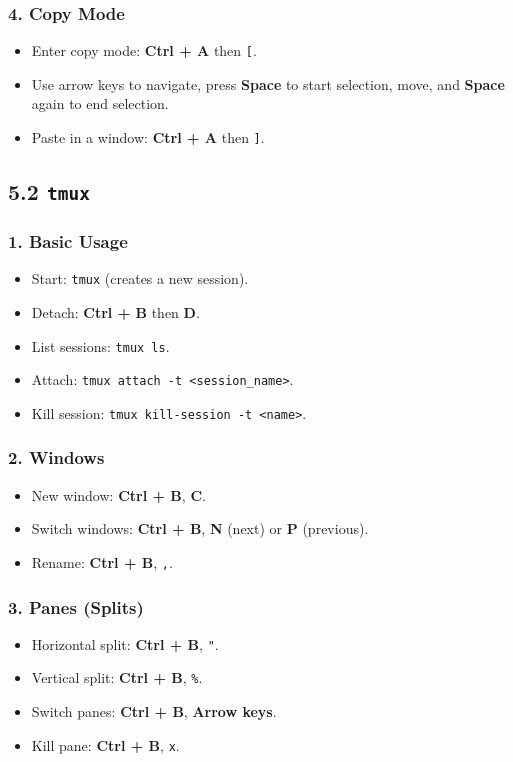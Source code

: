\documentclass[a4paper]{report}
\begin{document}
    \subsubsection*{4. Copy Mode}
    \begin{itemize}
        \item Enter copy mode: \textbf{Ctrl + A} then \texttt{[}.
        \item Use arrow keys to navigate, press \textbf{Space} to start selection, move, and \textbf{Space} again to end selection.
        \item Paste in a window: \textbf{Ctrl + A} then \texttt{]}.
    \end{itemize}
    
    \subsection*{5.2 \texttt{tmux}}
    
    \subsubsection*{1. Basic Usage}
    \begin{itemize}
        \item Start: \texttt{tmux} (creates a new session).
        \item Detach: \textbf{Ctrl + B} then \textbf{D}.
        \item List sessions: \texttt{tmux ls}.
        \item Attach: \texttt{tmux attach -t <session\_name>}.
        \item Kill session: \texttt{tmux kill-session -t <name>}.
    \end{itemize}
    
    \subsubsection*{2. Windows}
    \begin{itemize}
        \item New window: \textbf{Ctrl + B}, \textbf{C}.
        \item Switch windows: \textbf{Ctrl + B}, \textbf{N} (next) or \textbf{P} (previous).
        \item Rename: \textbf{Ctrl + B}, \texttt{,}.
    \end{itemize}
    
    \subsubsection*{3. Panes (Splits)}
    \begin{itemize}
        \item Horizontal split: \textbf{Ctrl + B}, \texttt{"}.
        \item Vertical split: \textbf{Ctrl + B}, \texttt{\%}.
        \item Switch panes: \textbf{Ctrl + B}, \textbf{Arrow keys}.
        \item Kill pane: \textbf{Ctrl + B}, \texttt{x}.
    \end{itemize}
    
\end{document}
